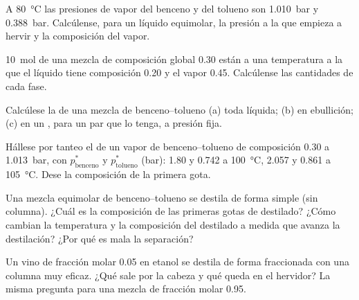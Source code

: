 \begin{exercise}[$\star$]\label{exo:b2:liquid-vapour-diagrams:2}
A \qty{80}{\degreeCelsius} las presiones de vapor del benceno y del tolueno son
\qty{1.010}{bar} y \qty{0.388}{bar}. Calcúlense, para un líquido equimolar, la
presión a la que empieza a hervir y la composición del vapor.
\end{exercise}

\begin{exercise}[$\star$]\label{exo:b2:liquid-vapour-diagrams:3}
\qty{10}{mol} de una mezcla de composición global 0.30 están a una temperatura
a la que el líquido tiene composición 0.20 y el vapor 0.45. Calcúlense las cantidades
de cada fase.
\end{exercise}

\begin{exercise}[$\star$]\label{exo:b2:liquid-vapour-diagrams:4}
Calcúlese la  de una mezcla de benceno--tolueno (a) toda líquida; (b)
en ebullición; (c) en un , para un par que lo tenga, a presión fija.
\end{exercise}

\begin{exercise}[$\star\star$]\label{exo:b2:liquid-vapour-diagrams:5}
Hállese por tanteo el  de un vapor de benceno--tolueno de composición 0.30 a
\qty{1.013}{bar}, con $p^*_{\text{benceno}}$ y $p^*_{\text{tolueno}}$
(\unit{bar}): 1.80 y 0.742 a \qty{100}{\degreeCelsius}, 2.057 y 0.861 a
\qty{105}{\degreeCelsius}. Dese la composición de la primera gota.
\end{exercise}

\begin{exercise}[$\star\star$]\label{exo:b2:liquid-vapour-diagrams:6}
Una mezcla equimolar de benceno--tolueno se destila de forma simple (sin columna). ¿Cuál es
la composición de las primeras gotas de destilado? ¿Cómo cambian la temperatura y
la composición del destilado a medida que avanza la destilación? ¿Por qué es
mala la separación?
\end{exercise}

\begin{exercise}[$\star\star$]\label{exo:b2:liquid-vapour-diagrams:7}
Un vino de fracción molar 0.05 en etanol se destila de forma fraccionada con una columna muy
eficaz. ¿Qué sale por la cabeza y qué queda en el hervidor?
La misma pregunta para una mezcla de fracción molar 0.95.
\end{exercise}

